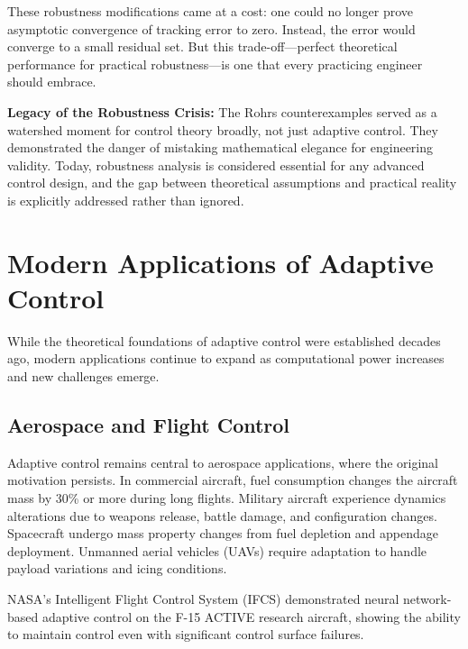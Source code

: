 These robustness modifications came at a cost: one could no longer prove asymptotic convergence of tracking error to zero. Instead, the error would converge to a small residual set. But this trade-off---perfect theoretical performance for practical robustness---is one that every practicing engineer should embrace.

\begin{historicalbox}
\textbf{Legacy of the Robustness Crisis:} The Rohrs counterexamples served as a watershed moment for control theory broadly, not just adaptive control. They demonstrated the danger of mistaking mathematical elegance for engineering validity. Today, robustness analysis is considered essential for any advanced control design, and the gap between theoretical assumptions and practical reality is explicitly addressed rather than ignored.
\end{historicalbox}

\section{Modern Applications of Adaptive Control}
\label{sec:adaptive_applications}

While the theoretical foundations of adaptive control were established decades ago, modern applications continue to expand as computational power increases and new challenges emerge.

\subsection{Aerospace and Flight Control}

Adaptive control remains central to aerospace applications, where the original motivation persists. In commercial aircraft, fuel consumption changes the aircraft mass by 30\% or more during long flights. Military aircraft experience dynamics alterations due to weapons release, battle damage, and configuration changes. Spacecraft undergo mass property changes from fuel depletion and appendage deployment. Unmanned aerial vehicles (UAVs) require adaptation to handle payload variations and icing conditions.

NASA's Intelligent Flight Control System (IFCS) demonstrated neural network-based adaptive control on the F-15 ACTIVE research aircraft, showing the ability to maintain control even with significant control surface failures.

